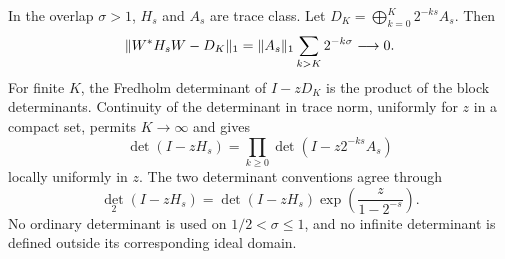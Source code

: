 In the overlap $\sigma>1$, $H_s$ and $A_s$ are trace class.  Let
$D_K=\bigoplus_{k=0}^K2^{-ks}A_s$.  Then
\[
  \lVert W^*H_sW-D_K\rVert_1
  =\lVert A_s\rVert_1\sum_{k>K}2^{-k\sigma}\longrightarrow0.
\]
For finite $K$, the Fredholm determinant of $I-zD_K$ is the product of the
block determinants.  Continuity of the determinant in trace norm, uniformly
for $z$ in a compact set, permits $K\to\infty$ and gives
\begin{equation}
  \det(I-zH_s)
  =\prod_{k\ge0}\det(I-z2^{-ks}A_s)
  \label{eq:det-product}
\end{equation}
locally uniformly in $z$.  The two determinant conventions agree through
\begin{equation}
  \det_2(I-zH_s)
  =\det(I-zH_s)\exp\!(\frac{z}{1-2^{-s}}).
  \label{eq:det-overlap}
\end{equation}
No ordinary determinant is used on $1/2<\sigma\le1$, and no infinite
determinant is defined outside its corresponding ideal domain.
